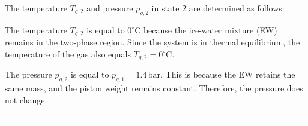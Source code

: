 The temperature \( T_{g,2} \) and pressure \( p_{g,2} \) in state 2 are determined as follows:  

The temperature \( T_{g,2} \) is equal to \( 0^\circ\text{C} \) because the ice-water mixture (EW) remains in the two-phase region. Since the system is in thermal equilibrium, the temperature of the gas also equals \( T_{g,2} = 0^\circ\text{C} \).  

The pressure \( p_{g,2} \) is equal to \( p_{g,1} = 1.4 \, \text{bar} \). This is because the EW retains the same mass, and the piston weight remains constant. Therefore, the pressure does not change.  

---